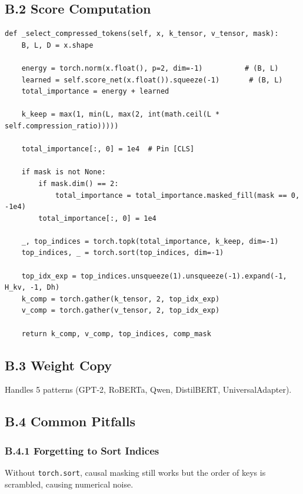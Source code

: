 \subsection{B.2 Score Computation}

\begin{lstlisting}
def _select_compressed_tokens(self, x, k_tensor, v_tensor, mask):
    B, L, D = x.shape
    
    energy = torch.norm(x.float(), p=2, dim=-1)          # (B, L)
    learned = self.score_net(x.float()).squeeze(-1)       # (B, L)
    total_importance = energy + learned
    
    k_keep = max(1, min(L, max(2, int(math.ceil(L * self.compression_ratio)))))
    
    total_importance[:, 0] = 1e4  # Pin [CLS]
    
    if mask is not None:
        if mask.dim() == 2:
            total_importance = total_importance.masked_fill(mask == 0, -1e4)
        total_importance[:, 0] = 1e4
    
    _, top_indices = torch.topk(total_importance, k_keep, dim=-1)
    top_indices, _ = torch.sort(top_indices, dim=-1)
    
    top_idx_exp = top_indices.unsqueeze(1).unsqueeze(-1).expand(-1, H_kv, -1, Dh)
    k_comp = torch.gather(k_tensor, 2, top_idx_exp)
    v_comp = torch.gather(v_tensor, 2, top_idx_exp)
    
    return k_comp, v_comp, top_indices, comp_mask
\end{lstlisting}

\subsection{B.3 Weight Copy}

Handles 5 patterns (GPT-2, RoBERTa, Qwen, DistilBERT, UniversalAdapter).

\subsection{B.4 Common Pitfalls}

\subsubsection{B.4.1 Forgetting to Sort Indices}

Without \texttt{torch.sort}, causal masking still works but the order of keys is 
scrambled, causing numerical noise.

